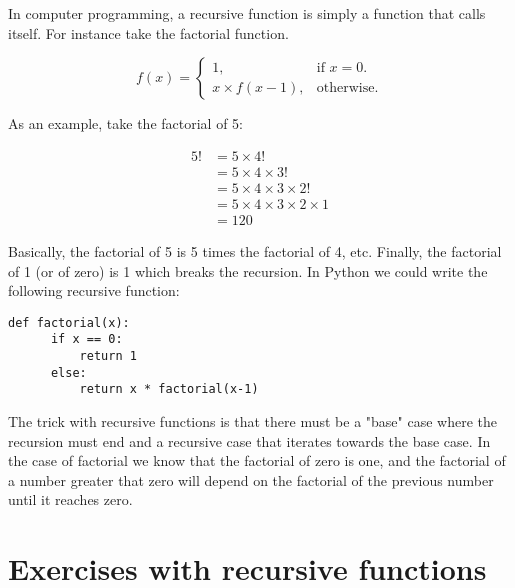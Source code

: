 In computer programming, a recursive function is simply a function that calls itself. For instance take the factorial function.

\begin{equation}
f(x)=\begin{cases}
    1, & \text{if $x=0$}.\\
    x \times f(x-1), & \text{otherwise}.
\end{cases}
\end{equation}

As an example, take the factorial of 5:

\begin{equation}
\begin{split}
5! &= 5 \times 4! \\
    &= 5 \times 4 \times 3! \\
    &= 5 \times 4 \times 3 \times 2! \\
    &= 5 \times 4 \times 3 \times 2 \times 1 \\
    &= 120
\end{split}
\end{equation}

Basically, the factorial of 5 is 5 times the factorial of 4, etc. Finally, the factorial of 1 (or of zero) is 1 which breaks the recursion. In Python we could write the following recursive function:

\begin{lstlisting}
def factorial(x):
      if x == 0:
          return 1
      else:
          return x * factorial(x-1)
\end{lstlisting}

The trick with recursive functions is that there must be a "base" case where the recursion must end and a recursive case that iterates towards the base case. In the case of factorial we know that the factorial of zero is one, and the factorial of a number greater that zero will depend on the factorial of the previous number until it reaches zero.

\section{Exercises with recursive functions}

